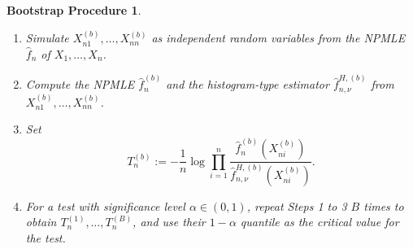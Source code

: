 \documentclass[12pt,letterpaper, twoside, openany]{article}
\theoremstyle{plain}
\newtheorem*{bootstrap}{Bootstrap Procedure}
\begin{document}
		
		\begin{bootstrap}\label{bootstrap_procedure}
			~
			\begin{enumerate}%
				\item Simulate $X_{n1}^{(b)},\ldots,X_{nn}^{(b)}$ as independent random  variables from the NPMLE $\hat{f}_n$ of $X_1,\ldots,X_n$.
    
				\item Compute the NPMLE $\hat{f}^{(b)}_n$ and the histogram-type estimator $\hat{f}_{n,\nu}^{H,(b)}$ from $X_{n1}^{(b)},\ldots,X_{nn}^{(b)}$.
    
				\item Set
				\begin{equation*}
					T_n^{(b)} := -\frac{1}{n}\log \prod_{i=1}^n  \frac{ \hat{f}_n^{(b)}(X_{ni}^{(b)})}{ \hat{f}_{n,\nu}^{H, (b)}(X_{ni}^{(b)})}.
				\end{equation*}
				
    
				\item 
      For a test with significance level $\alpha \in (0, 1)$, 
                repeat Steps 1 to 3 $B$ times to obtain $T^{(1)}_n,\ldots,T^{(B)}_n$, and use their $1-\alpha$ quantile as the critical value for the test.
			\end{enumerate}
		\end{bootstrap}
		
		
\end{document}
